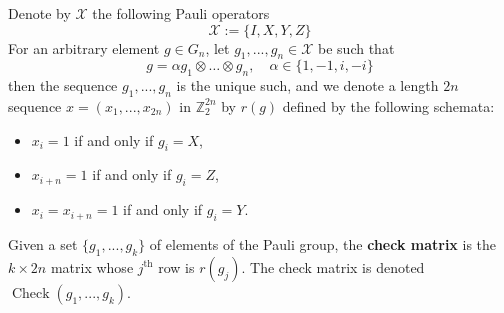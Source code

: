 \documentclass[12pt]{article}
\theoremstyle{plain}
\theoremstyle{definition}
\newcommand{\bb}[1]{\mathbb{#1}}
\newcommand{\scr}[1]{\mathscr{#1}}
\begin{document}
Denote by $\scr{X}$ the following Pauli operators
\begin{equation}
	\scr{X} := \lbrace I,X,Y,Z\rbrace
\end{equation}
For an arbitrary element $g \in G_n$,  let $g_1,...,g_n \in \scr{X}$ be such that
\begin{equation}\label{eq:canonical_tensor}
	g = \alpha g_1 \otimes \hdots \otimes g_n, \quad\alpha \in \{ 1,-1,i,-i \}
\end{equation}
then the sequence $g_1,...,g_n$ is the unique such, and we denote a length $2n$ sequence $x = (x_1,...,x_{2n})$ in $\bb{Z}_2^{2n}$ by $r(g)$ defined by the following schemata:
\begin{itemize}
	\item $x_i = 1$ if and only if $g_i = X$,
	\item $x_{i + n} = 1$ if and only if $g_i = Z$,
	\item $x_i = x_{i+n} = 1$ if and only if $g_i = Y$.
\end{itemize}
Given a set $\lbrace g_1,...,g_k\rbrace$ of elements of the Pauli group, the \textbf{check matrix} is the $k \times 2n$ matrix whose $j^\text{th}$ row is $r(g_j)$. The check matrix is denoted $\operatorname{Check}(g_1,...,g_k)$.
\end{document}
